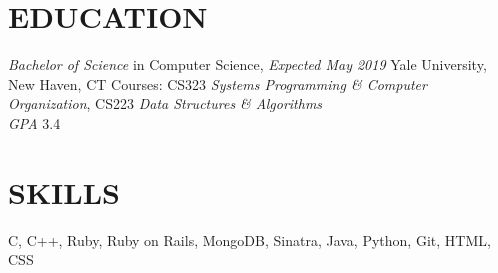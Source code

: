 \documentclass[margin, centered]{res}
\begin{document}
\address{\href{mailto:melina.delgado@yale.edu}{melina.delgado@yale.edu} | \href{http://melinadelgado.com}{melinadelgado.com} \\ 71 Bristol St, New Haven, CT 06511 | (954) 682-8999}

\begin{resume}
  \section{EDUCATION}
  \textit{Bachelor of Science} in Computer Science, \textit{Expected May 2019} \newline
  Yale University, New Haven, CT \newline
  Courses: CS323 \textit{Systems Programming \& Computer Organization}, CS223 \textit{Data Structures \& Algorithms} \\ 
  \textit{GPA} 3.4

  \section{SKILLS}
  C, C++, Ruby, Ruby on Rails, MongoDB, Sinatra, Java, Python, Git, HTML, CSS


\end{resume}
\end{document}
